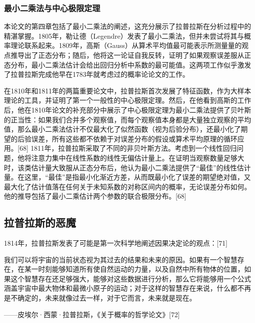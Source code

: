 \subsubsection{最小二乘法与中心极限定理}  
本论文的第四章包括了最小二乘法的阐述，这充分展示了拉普拉斯在分析过程中的精湛掌握。1805年，勒让德（Legendre）发表了最小二乘法，但并未尝试将其与概率理论联系起来。1809年，高斯（Gauss）从算术平均值最可能表示所测量量的观点推导出了正态分布；随后，他将这一论证自我反转，证明了如果观察误差服从正态分布，最小二乘法估计会给出回归分析中系数的最可能值。这两项工作似乎激发了拉普拉斯完成他早在1783年就考虑过的概率论论文的工作。

在1810年和1811年的两篇重要论文中，拉普拉斯首次发展了特征函数，作为大样本理论的工具，并证明了第一个一般性的中心极限定理。然后，在他看到高斯的工作后，他在1810年论文的补充部分中展示了中心极限定理为最小二乘法提供了贝叶斯的正当性：如果我们合并多个观察值，而每个观察值本身都是大量独立观察的平均值，那么最小二乘法估计不仅最大化了似然函数（视为后验分布），还最小化了期望的后验误差，所有这些都不依赖于对误差分布的假设或算术平均原理的循环应用。[68] 1811年，拉普拉斯采取了不同的非贝叶斯方法。考虑到一个线性回归问题，他将注意力集中在线性系数的线性无偏估计量上。在证明当观察数量足够大时，该类估计量大致服从正态分布后，他认为最小二乘法提供了“最佳”的线性估计量。在这里，“最佳”是指最小化渐近方差，从而既最小化了误差的期望绝对值，又最大化了估计值落在任何关于未知系数的对称区间内的概率，无论误差分布如何。他的推导包括了最小二乘估计两个参数的联合极限分布。[68]
\subsection{拉普拉斯的恶魔}  
1814年，拉普拉斯发表了可能是第一次科学地阐述因果决定论的观点：[71]  

我们可以将宇宙的当前状态视为其过去的结果和未来的原因。如果有一个智慧存在，在某一时刻能够知道所有使自然运动的力量，以及自然中所有物体的位置，如果这个智慧存在还足够强大，能够对这些数据进行分析，那么它将能够用一个公式涵盖宇宙中最大物体和最微小原子的运动；对于这样的智慧存在来说，什么都不再是不确定的，未来就像过去一样，对于它而言，未来就是现在。  

——皮埃尔·西蒙·拉普拉斯，《关于概率的哲学论文》[72]